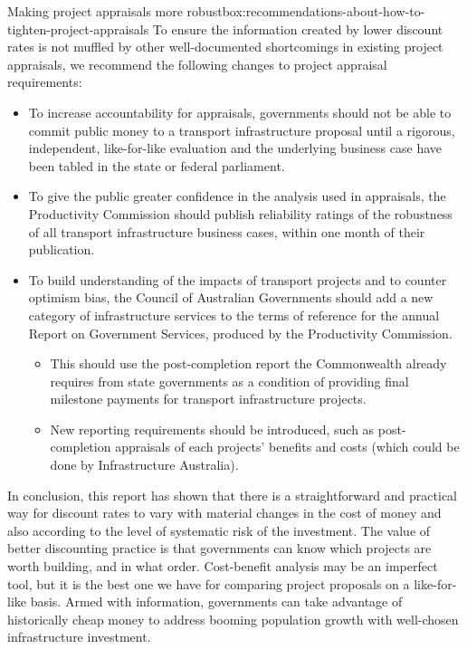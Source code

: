 \documentclass{grattan}
\begin{document}
\begin{smallbox}{Making project appraisals more robust}{box:recommendations-about-how-to-tighten-project-appraisals}
To ensure the information created by lower discount rates is not muffled by other well-documented shortcomings in existing project appraisals, we recommend the following changes to project appraisal requirements:
\begin{itemize}
\item To increase accountability for appraisals, governments should not be able to commit public money to a transport infrastructure proposal until a rigorous, independent, like-for-like evaluation and the underlying business case have been tabled in the state or federal parliament. 
\item To give the public greater confidence in the analysis used in appraisals, the Productivity Commission should publish reliability ratings of the robustness of all transport infrastructure business cases, within one month of their publication.
\item To build understanding of the impacts of transport projects and to counter optimism bias, the Council of Australian Governments should add a new category of infrastructure services to the terms of reference for the annual Report on Government Services, produced by the Productivity Commission. 
\begin{itemize}
\item This should use the post-completion report the Commonwealth already requires from state governments as a condition of providing final milestone payments for transport infrastructure projects. 
\item New reporting requirements should be introduced, such as post-completion appraisals of each projects' benefits and costs (which could be done by Infrastructure Australia).
\end{itemize}
\end{itemize}
\end{smallbox}

In conclusion, this report has shown that there is a straightforward and practical way for discount rates to vary with material changes in the cost of money and also according to the level of systematic risk of the investment. The value of better discounting practice is that governments can know which projects are worth building, and in what order. Cost-benefit analysis may be an imperfect tool, but it is the best one we have for comparing project proposals on a like-for-like basis. Armed with information, governments can take advantage of historically cheap money to address booming population growth with well-chosen infrastructure investment.























\printbibliography
\end{document}
